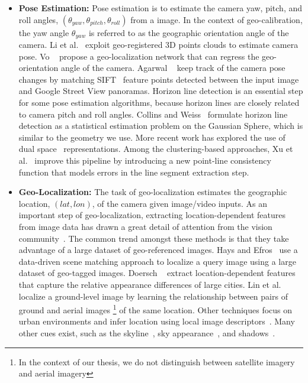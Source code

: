 \begin{itemize}[noitemsep]

\item \textbf{Pose Estimation:}
Pose estimation is to estimate the camera yaw, pitch, and roll
angles, $(\theta_{yaw}, \theta_{pitch}, \theta_{roll})$ from a
image. In the context of geo-calibration, the yaw angle
$\theta_{yaw}$ is referred to as the geographic orientation angle of
the camera.
%
Li et al.~\cite{li2012worldwide} exploit geo-registered 3D points
clouds to estimate camera pose.
Vo \etal~\cite{vo2016localizing} propose a geo-localization network
that can regress the geo-orientation angle of the camera.
Agarwal \etal~\cite{agarwal2015metric} keep track of the camera pose
changes by matching SIFT~\cite{lowe1999object} feature points detected
between the input image and Google Street View panoramas.
%
Horizon line detection is an essential step for some pose
estimation algorithms, because horizon lines are closely related to
camera pitch and roll angles.
Collins and Weiss~\cite{unitsphere1990} formulate horizon line
detection as a statistical estimation problem on the Gaussian Sphere,
which is similar to the geometry we use.  More recent work has
explored the use of dual space~\cite{alignment2014,dualspace2013}
representations. Among the clustering-based approaches, Xu et
al.~\cite{kitware2013} improve this pipeline by introducing a new
point-line consistency function that models errors in the line segment
extraction step.
\newline

\item \textbf{Geo-Localization:}
The task of geo-localization estimates the geographic location, $(lat,
lon)$, of the camera given image/video inputs.
%
As an important step of geo-localization, extracting
location-dependent features from image data has drawn a great detail
of attention from the vision community~\cite{jacobs07geolocate,
jacobs11geolocate, jacobs08geoorient}. The common trend amongst these
methods is that they take advantage of a large dataset of
geo-referenced images. Hays and Efros~\cite{hays2008im2gps} use a
data-driven scene matching approach to localize a query image using a
large dataset of geo-tagged images.  Doersch
\etal~\cite{doersch2012what} extract location-dependent features that
capture the relative appearance differences of large cities.  Lin et
al.~\cite{lin2013cross} localize a ground-level image by learning the
relationship between pairs of ground and aerial images \footnote{In
the context of our thesis, we do not distinguish between satellite
imagery and aerial imagery} of the same location. Other techniques
focus on urban environments and infer location using local image
descriptors~\cite{schindler2008detecting,snavely2006photo}.  Many
other cues exist, such as the
skyline~\cite{baatz2012large,ramalingam2009geolocalization}, sky
appearance~\cite{lalonde2010sun,workman2014rainbow}, and
shadows~\cite{junejo2008estimating,wu2010geo}.
\newline


\end{itemize}
